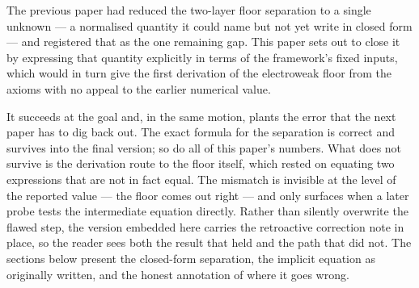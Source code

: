 \documentclass[12pt, a4paper]{article}
\begin{document}


\newpage

The previous paper had reduced the two-layer floor separation to a single
unknown --- a normalised quantity it could name but not yet write in closed
form --- and registered that as the one remaining gap. This paper sets out to
close it by expressing that quantity explicitly in terms of the framework's
fixed inputs, which would in turn give the first derivation of the electroweak
floor from the axioms with no appeal to the earlier numerical value.

It succeeds at the goal and, in the same motion, plants the error that the
next paper has to dig back out. The exact formula for the separation is
correct and survives into the final version; so do all of this paper's
numbers. What does not survive is the derivation route to the floor itself,
which rested on equating two expressions that are not in fact equal. The
mismatch is invisible at the level of the reported value --- the floor comes
out right --- and only surfaces when a later probe tests the intermediate
equation directly. Rather than silently overwrite the flawed step, the version
embedded here carries the retroactive correction note in place, so the reader
sees both the result that held and the path that did not. The sections below
present the closed-form separation, the implicit equation as originally
written, and the honest annotation of where it goes wrong.

\sloppy
\end{document}
